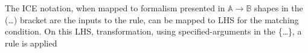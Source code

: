 The ICE notation, when mapped to formalism presented in $\mathbb{A} \rightarrow \mathbb{B}$ shapes in the (\ldots) bracket are the inputs to the rule, can be mapped to LHS for the matching condition. On this LHS, transformation, using specified-arguments in the \{\ldots\}, a rule is applied

%
%
%
%
%
%
%
%
%
